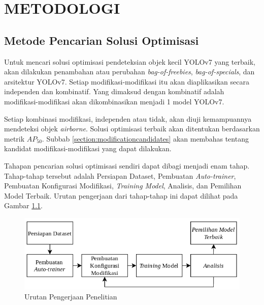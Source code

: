 \chapter{METODOLOGI}
\section{Metode Pencarian Solusi Optimisasi}
  Untuk mencari solusi optimisasi pendeteksian objek kecil YOLOv7 yang terbaik, akan dilakukan penambahan atau perubahan \emph{bag-of-freebies}, \emph{bag-of-specials}, dan arsitektur YOLOv7.
  Setiap modifikasi-modifikasi itu akan diaplikasikan secara independen dan kombinatif.
  Yang dimaksud dengan kombinatif adalah modifikasi-modifikasi akan dikombinasikan menjadi 1 model YOLOv7.

  Setiap kombinasi modifikasi, independen atau tidak, akan diuji kemampuannya mendeteksi objek \emph{airborne}.
  Solusi optimisasi terbaik akan ditentukan berdasarkan metrik $AP_{50}$.
  Subbab \ref{section:modificationcandidates} akan membahas tentang kandidat modifikasi-modifikasi yang dapat dilakukan.

  Tahapan pencarian solusi optimisasi sendiri dapat dibagi menjadi enam tahap.
  Tahap-tahap tersebut adalah Persiapan Dataset, Pembuatan \emph{Auto-trainer}, Pembuatan Konfigurasi Modifikasi, \emph{Training Model}, Analisis, dan Pemilihan Model Terbaik.
  Urutan pengerjaan dari tahap-tahap ini dapat dilihat pada Gambar \ref{fig:metodologi}.
  \begin{figure}[H]
    \centering
    \includegraphics[scale=0.8]{figures/metodologi.png}
    \caption{Urutan Pengerjaan Penelitian}
    \label{fig:metodologi}
  \end{figure}
  \vspace{-1ex}

